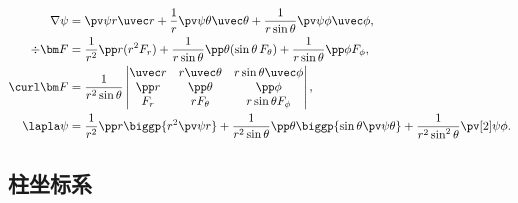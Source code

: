 \begin{align}
    \nabla\psi&=\pv\psi r\uvec r+\frac1r\pv\psi \theta\uvec\theta+\frac1{r\sin\theta}\pv\psi \phi\uvec\phi,\\
    \div\bm F&=\frac1{r^2}\pp r(r^2F_r)+\frac1{r\sin\theta}\pp\theta(\sin\theta\,F_\theta)+\frac1{r\sin\theta}\pp\phi F_\phi,\\
    \curl\bm F&=\frac1{r^2\sin\theta}
    \begin{vmatrix}
        \uvec r&r\uvec\theta&r\sin\theta\uvec\phi\\
        \pp r&\pp\theta&\pp\phi\\
        F_r&rF_\theta&r\sin\theta F_\phi
    \end{vmatrix},\\
    \lapla\psi&=\frac1{r^2}\pp r\biggp{r^2\pv\psi r}+\frac1{r^2\sin\theta}\pp\theta\biggp{\sin\theta\pv\psi\theta}+\frac1{r^2\sin^2\theta}\pv[2]\psi\phi.
\end{align}

\subsection{柱坐标系}
\label{ssec:cylindrical coordinate}

